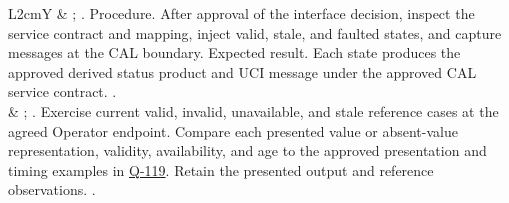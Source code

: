 \begin{tabularx}{\linewidth}{L{2cm}Y}
 & ; . Procedure. After approval of the interface decision, inspect the service contract and mapping, inject valid, stale, and faulted states, and capture messages at the CAL boundary. Expected result. Each state produces the approved derived status product and UCI message under the approved CAL service contract. \StatusPending.\\
 & ; . Exercise current valid, invalid, unavailable, and stale reference cases at the agreed Operator endpoint. Compare each presented value or absent-value representation, validity, availability, and age to the approved presentation and timing examples in \hyperref[Question:Q-119]{Q-119}. Retain the presented output and reference observations. \StatusPending.\\
\end{tabularx}
\normalsize

